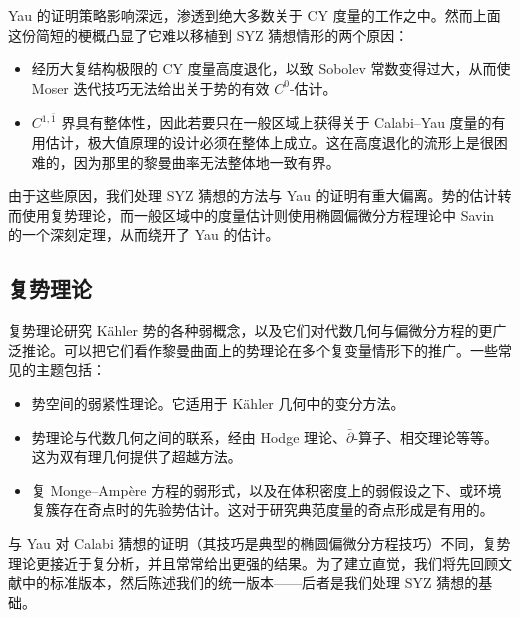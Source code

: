 
Yau 的证明策略影响深远，渗透到绝大多数关于 CY 度量的工作之中。然而上面这份简短的梗概凸显了它难以移植到 SYZ 猜想情形的两个原因：

\begin{itemize}
\item 经历大复结构极限的 CY 度量高度退化，以致 Sobolev 常数变得过大，从而使 Moser 迭代技巧无法给出关于势的有效 $C^0$-估计。
\item $C^{1,\bar1}$ 界具有整体性，因此若要只在一般区域上获得关于 Calabi--Yau 度量的有用估计，极大值原理的设计必须在整体上成立。这在高度退化的流形上是很困难的，因为那里的黎曼曲率无法整体地一致有界。
\end{itemize}

由于这些原因，我们处理 SYZ 猜想的方法与 Yau 的证明有重大偏离。势的估计转而使用复势理论，而一般区域中的度量估计则使用椭圆偏微分方程理论中 Savin 的一个深刻定理，从而绕开了 Yau 的估计。


\subsection{复势理论}

复势理论研究 Kähler 势的各种弱概念，以及它们对代数几何与偏微分方程的更广泛推论。可以把它们看作黎曼曲面上的势理论在多个复变量情形下的推广。一些常见的主题包括：
\begin{itemize}
\item 势空间的弱紧性理论。它适用于 Kähler 几何中的变分方法。
\item 势理论与代数几何之间的联系，经由 Hodge 理论、$\bar\partial$-算子、相交理论等等。这为双有理几何提供了超越方法。
\item 复 Monge--Ampère 方程的弱形式，以及在体积密度上的弱假设之下、或环境复簇存在奇点时的先验势估计。这对于研究典范度量的奇点形成是有用的。
\end{itemize}
与 Yau 对 Calabi 猜想的证明（其技巧是典型的椭圆偏微分方程技巧）不同，复势理论更接近于复分析，并且常常给出更强的结果。为了建立直觉，我们将先回顾文献中的标准版本，然后陈述我们的统一版本------后者是我们处理 SYZ 猜想的基础。

